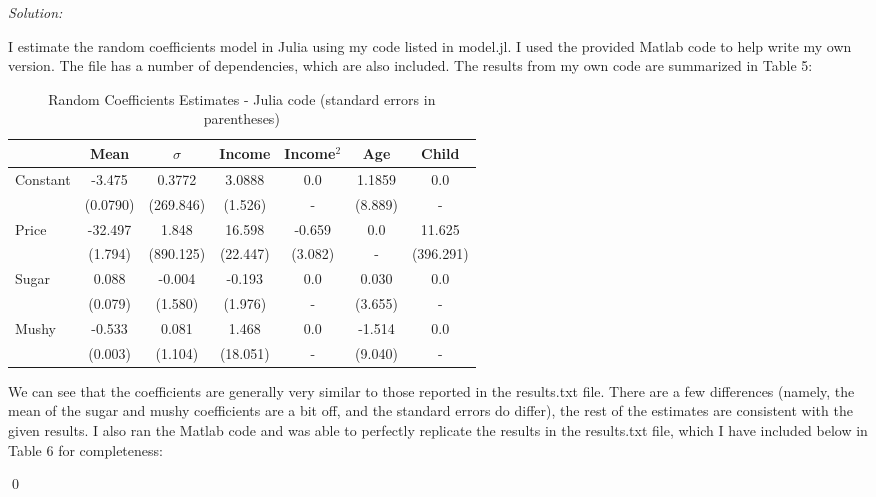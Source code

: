 \documentclass[12pt]{article}
\newenvironment{sol}
    {\emph{Solution:}
    }
    {
    \qed
    }
\begin{document}
\begin{sol}
    I estimate the random coefficients model in Julia using my code listed in model.jl. I used the provided Matlab code to help write my own version. The file has a number of dependencies, which are also included. The results from my own code are summarized in Table 5:
    \begin{center}
        \begin{table}[htbp]
            \centering
            \caption{Random Coefficients Estimates - Julia code (standard errors in parentheses)}
              \begin{tabular}{lcccccc}
                  \toprule
                        & Mean          & $\sigma$ & Income & Income$^2$ & Age & Child        \\
                    \midrule
                    Constant &    -3.475 & 0.3772 & 3.0888 & 0.0 & 1.1859 & 0.0   \\
                    & (0.0790) & (269.846) & (1.526)& - & (8.889) & -\\
                    Price &    -32.497  & 1.848 & 16.598 & -0.659 & 0.0 & 11.625 \\
                    &  (1.794) & (890.125) & (22.447) & (3.082) & - & (396.291)        \\
                    Sugar & 0.088& -0.004 & -0.193 & 0.0&  0.030& 0.0\\
                    & (0.079)& (1.580) & (1.976) & - & (3.655)& -\\
                    Mushy &  -0.533 & 0.081 & 1.468 & 0.0 & -1.514 & 0.0   \\
                    & (0.003)& (1.104) & (18.051)&-& (9.040) & -\\
                  \bottomrule
              \end{tabular}
            \label{tab:blp_julia}
          \end{table}
    \end{center}
    We can see that the coefficients are generally very similar to those reported in the results.txt file. There are a few differences (namely, the mean of the sugar and mushy coefficients are a bit off, and the standard errors do differ), the rest of the estimates are consistent with the given results. I also ran the Matlab code and was able to perfectly replicate the results in the results.txt file, which I have included below in Table 6 for completeness:
    \begin{center}
        \begin{table}[htbp]

\end{table}
\end{center}
\end{sol}
\end{document}
